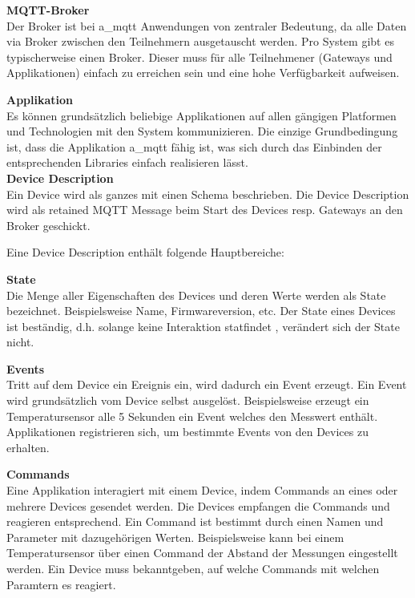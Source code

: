 \textbf{MQTT-Broker} \\
Der Broker ist bei \acrshort{a_mqtt} Anwendungen von zentraler Bedeutung, da alle Daten via Broker zwischen den Teilnehmern ausgetauscht werden. Pro System gibt es typischerweise einen Broker. Dieser muss für alle Teilnehmener (Gateways und Applikationen) einfach zu erreichen sein und eine hohe Verfügbarkeit aufweisen.

\textbf{Applikation} \\
Es können grundsätzlich beliebige Applikationen auf allen gängigen Platformen und Technologien mit den System kommunizieren. Die einzige Grundbedingung ist, dass die Applikation \acrshort{a_mqtt} fähig ist, was sich durch das Einbinden der entsprechenden Libraries einfach realisieren lässt.
\\


\textbf{Device Description} \\
Ein Device wird als ganzes mit einen Schema beschrieben. Die Device Description wird als retained MQTT Message beim Start des Devices resp. Gateways an den Broker geschickt.

Eine Device Description enthält folgende Hauptbereiche:

\textbf{State} \\
Die Menge aller Eigenschaften des Devices und deren Werte werden als State bezeichnet. Beispielsweise Name, Firmwareversion, etc. Der State eines Devices ist beständig, d.h. solange keine Interaktion statfindet , verändert sich der State nicht.


\textbf{Events} \\
Tritt auf dem Device ein Ereignis ein, wird dadurch ein Event erzeugt. Ein Event wird grundsätzlich vom Device selbst ausgelöst. Beispielsweise erzeugt ein Temperatursensor alle 5 Sekunden ein Event welches den Messwert enthält. Applikationen registrieren sich, um bestimmte Events von den Devices zu erhalten.


\textbf{Commands} \\
Eine Applikation interagiert mit einem Device, indem Commands an eines oder mehrere Devices gesendet werden. Die Devices empfangen die Commands und reagieren entsprechend. Ein Command ist bestimmt durch einen Namen und Parameter mit dazugehörigen Werten. 
Beispielsweise kann bei einem Temperatursensor über einen Command  der Abstand der Messungen eingestellt werden.
Ein Device muss bekanntgeben, auf welche Commands mit welchen Paramtern es reagiert.


